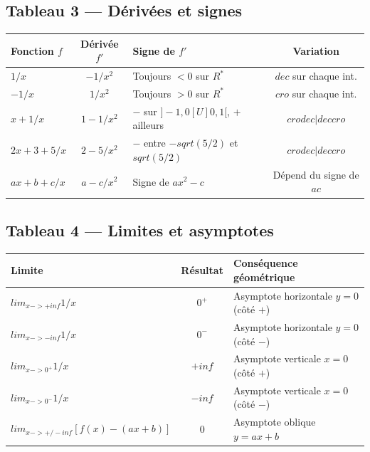 \documentclass[10pt,a4paper]{article}
\def\to{->}\def\mapsto{->}\def\infty{inf}\def\pm{+/-}%
\def\mathbb#1{#1}\def\lim{lim}\def\cup{U}\def\not{}%
\def\searrow{dec}\def\nearrow{cro}\def\cdot{*}\def\le{<=}\def\ge{>=}%
\def\sqrt#1{sqrt(#1)}\def\left{}\def\right{}%
\begin{document}
	\subsection*{Tableau 3 — D\'eriv\'ees et signes}
	
	\begin{center}\renewcommand{\arraystretch}{1.35}
		\begin{tabularx}{\linewidth}{|l|c|X|c|}
			\hline
			\rowcolor{green!22}\textbf{Fonction $f$} & \textbf{D\'eriv\'ee $f'$} & \textbf{Signe de $f'$} & \textbf{Variation}\\
			\hline
			$1/x$ & $-1/x^{2}$ & Toujours $<0$ sur $\mathbb{R}^*$ & $\searrow$ sur chaque int.\\
			\hline
			$-1/x$ & $1/x^{2}$ & Toujours $>0$ sur $\mathbb{R}^*$ & $\nearrow$ sur chaque int.\\
			\hline
			$x+1/x$ & $1-1/x^{2}$ & $-$ sur $]-1,0[\cup]0,1[$, $+$ ailleurs & $\nearrow\searrow|\searrow\nearrow$\\
			\hline
			$2x+3+5/x$ & $2-5/x^{2}$ & $-$ entre $-\sqrt{5/2}$ et $\sqrt{5/2}$ & $\nearrow\searrow|\searrow\nearrow$\\
			\hline
			$ax+b+c/x$ & $a-c/x^{2}$ & Signe de $ax^{2}-c$ & D\'epend du signe de $ac$\\
			\hline
		\end{tabularx}
	\end{center}
	
	\subsection*{Tableau 4 — Limites et asymptotes}
	
	\begin{center}\renewcommand{\arraystretch}{1.35}
		\begin{tabular}{|l|c|l|}
			\hline
			\rowcolor{orange!25}\textbf{Limite} & \textbf{R\'esultat} & \textbf{Cons\'equence g\'eom\'etrique}\\
			\hline
			$\lim_{x\to+\infty} 1/x$ & $0^{+}$ & Asymptote horizontale $y=0$ (c\^ot\'e $+$)\\
			\hline
			$\lim_{x\to-\infty} 1/x$ & $0^{-}$ & Asymptote horizontale $y=0$ (c\^ot\'e $-$)\\
			\hline
			$\lim_{x\to 0^{+}} 1/x$ & $+\infty$ & Asymptote verticale $x=0$ (c\^ot\'e $+$)\\
			\hline
			$\lim_{x\to 0^{-}} 1/x$ & $-\infty$ & Asymptote verticale $x=0$ (c\^ot\'e $-$)\\
			\hline
			$\lim_{x\to\pm\infty}[f(x)-(ax+b)]$ & $0$ & Asymptote oblique $y=ax+b$\\
			\hline
		\end{tabular}
	\end{center}
	
\end{document}
